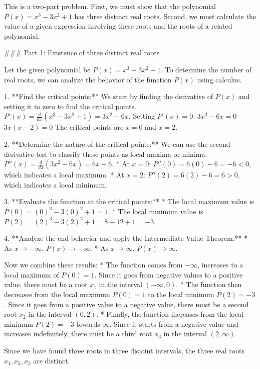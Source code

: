 This is a two-part problem. First, we must show that the polynomial $P(x) = x^3 - 3x^2 + 1$ has three distinct real roots. Second, we must calculate the value of a given expression involving these roots and the roots of a related polynomial.

### Part 1: Existence of three distinct real roots

Let the given polynomial be $P(x) = x^3 - 3x^2 + 1$. To determine the number of real roots, we can analyze the behavior of the function $P(x)$ using calculus.

1.  **Find the critical points:** We start by finding the derivative of $P(x)$ and setting it to zero to find the critical points.
    $P'(x) = \frac{d}{dx}(x^3 - 3x^2 + 1) = 3x^2 - 6x$.
    Setting $P'(x) = 0$:
    $3x^2 - 6x = 0$
    $3x(x - 2) = 0$
    The critical points are $x=0$ and $x=2$.

2.  **Determine the nature of the critical points:** We can use the second derivative test to classify these points as local maxima or minima.
    $P''(x) = \frac{d}{dx}(3x^2 - 6x) = 6x - 6$.
    *   At $x=0$: $P''(0) = 6(0) - 6 = -6 < 0$, which indicates a local maximum.
    *   At $x=2$: $P''(2) = 6(2) - 6 = 6 > 0$, which indicates a local minimum.

3.  **Evaluate the function at the critical points:**
    *   The local maximum value is $P(0) = (0)^3 - 3(0)^2 + 1 = 1$.
    *   The local minimum value is $P(2) = (2)^3 - 3(2)^2 + 1 = 8 - 12 + 1 = -3$.

4.  **Analyze the end behavior and apply the Intermediate Value Theorem:**
    *   As $x \to -\infty$, $P(x) \to -\infty$.
    *   As $x \to \infty$, $P(x) \to \infty$.

    Now we combine these results:
    *   The function comes from $-\infty$, increases to a local maximum of $P(0)=1$. Since it goes from negative values to a positive value, there must be a root $x_1$ in the interval $(-\infty, 0)$.
    *   The function then decreases from the local maximum $P(0)=1$ to the local minimum $P(2)=-3$. Since it goes from a positive value to a negative value, there must be a second root $x_2$ in the interval $(0, 2)$.
    *   Finally, the function increases from the local minimum $P(2)=-3$ towards $\infty$. Since it starts from a negative value and increases indefinitely, there must be a third root $x_3$ in the interval $(2, \infty)$.

Since we have found three roots in three disjoint intervals, the three real roots $x_1, x_2, x_3$ are distinct.

